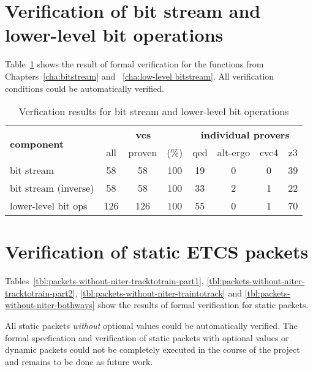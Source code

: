 \clearpage

\section{Verification of bit stream and lower-level bit operations}
\label{sec:bitstream-verification}

Table~\ref{tbl:bitstream-verification} shows the result of formal verification
for the functions from Chapters~\ref{cha:bitstream} and ~\ref{cha:low-level bitstream}.
All verification conditions could be automatically verified.

\begin{table}[hbt]
\begin{center}
    \begin{tabular}{|l|ccc|cccc|}
\hline
\multirow{2}{*}{\textbf{component}} &
\multicolumn{3}{c|}{ \textbf{vcs}} &
\multicolumn{4}{c|}{\textbf{individual provers}}\\
\cline{2-8}
               &  all & proven & (\%) & qed & alt-ergo & cvc4 & z3  \\
\hline
\hline
bit stream     & 58 &  58 & 100 & 19 &  0 & 0 & 39  \\
\hline
bit stream (inverse)  & 58 & 58 & 100 & 33 &  2 & 1 & 22  \\
\hline
lower-level bit ops & 126 & 126 & 100 & 55 &  0 & 1 & 70  \\
\hline
\end{tabular}
\end{center}
\caption{\label{tbl:bitstream-verification} Verfication results for bit stream and lower-level bit operations}
\end{table}

\FloatBarrier  %

\section{Verification of static ETCS packets}
\label{sec:packets-without-niter-verification}

Tables~\ref{tbl:packets-without-niter-tracktotrain-part1},
\ref{tbl:packets-without-niter-tracktotrain-part2},
\ref{tbl:packets-without-niter-traintotrack} and
\ref{tbl:packets-without-niter-bothways}
show the results of formal verification for static packets.

All static packets \emph{without} optional values could be automatically verified.
The formal specfication and verification of static packets with optional values or
dynamic packets could not be completely executed in the course of the project and 
remains to be done as future work.

